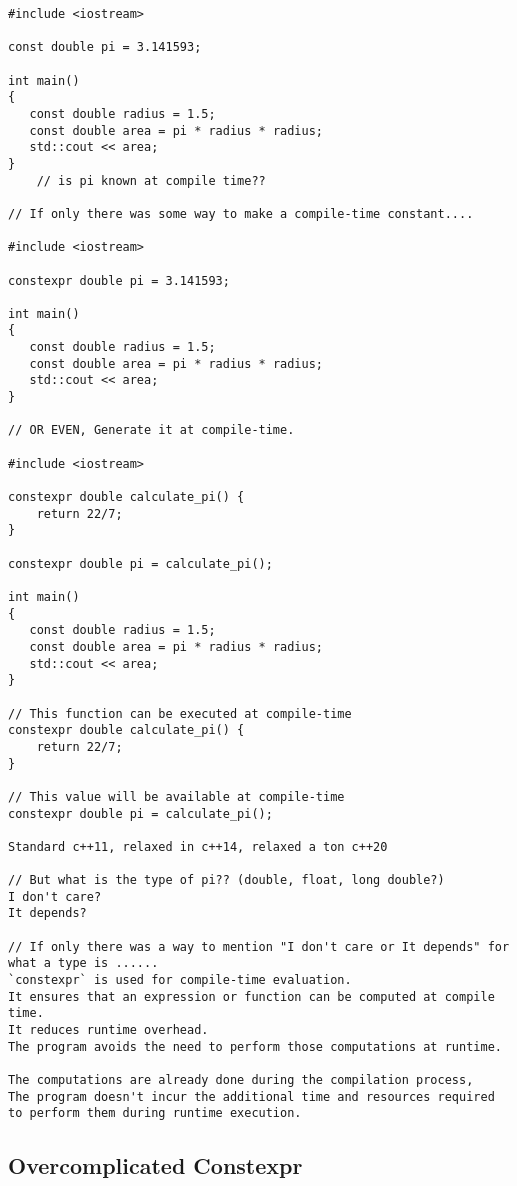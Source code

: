 \begin{verbatim}
#include <iostream>

const double pi = 3.141593;

int main()
{
   const double radius = 1.5;
   const double area = pi * radius * radius;
   std::cout << area;
}
    // is pi known at compile time??

// If only there was some way to make a compile-time constant....

#include <iostream>

constexpr double pi = 3.141593;

int main()
{
   const double radius = 1.5;
   const double area = pi * radius * radius;
   std::cout << area;
}

// OR EVEN, Generate it at compile-time.

#include <iostream>

constexpr double calculate_pi() {
    return 22/7;
}

constexpr double pi = calculate_pi();

int main()
{
   const double radius = 1.5;
   const double area = pi * radius * radius;
   std::cout << area;
}

// This function can be executed at compile-time
constexpr double calculate_pi() {
    return 22/7;
}

// This value will be available at compile-time 
constexpr double pi = calculate_pi();

Standard c++11, relaxed in c++14, relaxed a ton c++20

// But what is the type of pi?? (double, float, long double?)
I don't care?
It depends?

// If only there was a way to mention "I don't care or It depends" for what a type is ......  
`constexpr` is used for compile-time evaluation.
It ensures that an expression or function can be computed at compile time.
It reduces runtime overhead.
The program avoids the need to perform those computations at runtime. 

The computations are already done during the compilation process, 
The program doesn't incur the additional time and resources required
to perform them during runtime execution.
\end{verbatim}

\subsection{Overcomplicated Constexpr}


